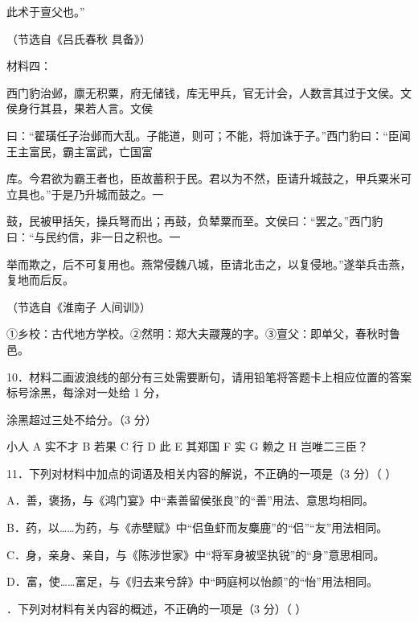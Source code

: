 \documentclass[UTF8,a4paper,fontset=fandol]{ctexart}
\begin{document}
此术于{亶父}也。”\par
\hspace*{1.8em}（节选自《吕氏春秋          具备》）\par
\vspace{0.35em}\par
材料四：\par
\hspace*{1.8em}西门豹治邺，廪无积粟，府无储钱，库无甲兵，官无计会，人数言其过于文侯。文侯身行其县，果若人言。文侯\par
曰：“翟璜任子治邺而大乱。子能道，则可；不能，将加诛于子。”西门豹曰：“臣闻王主富民，霸主富武，亡国富\par
库。今君欲为霸王者也，臣故蓄积于民。君以为不然，臣请升城鼓之，甲兵粟米可立具也。”于是乃升城而鼓之。一\par
鼓，民被甲括矢，操兵弩而出；再鼓，负辇粟而至。文侯曰：“罢之。”西门豹曰：“与民约信，非一日之积也。一\par
举而欺之，后不可复用也。燕常侵魏八城，臣请北击之，以复侵地。”遂举兵击燕，复地而后反。\par
\hspace*{1.8em}（节选自《淮南子         人间训》）\par
\vspace{0.35em}\par
[注] ①乡校：古代地方学校。②然明：郑大夫{鬷}蔑的字。③亶父：即单父，春秋时鲁邑。\par
\vspace{0.35em}\par
10．材料二画波浪线的部分有三处需要断句，请用铅笔将答题卡上相应位置的答案标号涂黑，每涂对一处给 1 分，\par
涂黑超过三处不给分。（3 分）\par
小人 A 实不才 B 若果 C 行 D 此 E 其郑国 F 实 G 赖之 H 岂唯二三臣？\par
11．下列对材料中加点的词语及相关内容的解说，不正确的一项是（3 分）（ ）\par
A．善，褒扬，与《鸿门宴》中“素善留侯张良”的“善”用法、意思均相同。\par
B．药，以……为药，与《赤壁赋》中“侣鱼虾而友麋鹿”的“侣”“友”用法相同。\par
C．身，亲身、亲自，与《陈涉世家》中“将军身被坚执锐”的“身”意思相同。\par
D．富，使……富足，与《归去来兮辞》中“眄庭柯以怡颜”的“怡”用法相同。\par
{}．下列对材料有关内容的概述，不正确的一项是（3 分）（ ）\par
\end{document}
